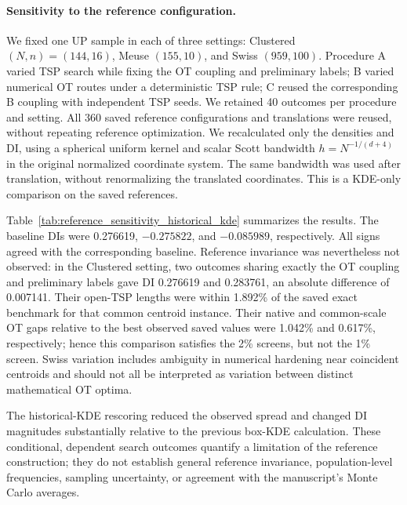 {\color{red}
\paragraph{Sensitivity to the reference configuration.}
We fixed one UP sample in each of three settings: Clustered $(N,n)=(144,16)$,
Meuse $(155,10)$, and Swiss $(959,100)$. Procedure A varied TSP search while
fixing the OT coupling and preliminary labels; B varied numerical OT routes
under a deterministic TSP rule; C reused the corresponding B coupling with
independent TSP seeds. We retained 40 outcomes per procedure and setting.
All 360 saved reference configurations and translations were reused, without
repeating reference optimization. We recalculated only the densities and DI,
using a spherical uniform kernel and scalar Scott bandwidth
$h=N^{-1/(d+4)}$ in the original normalized coordinate system. The same
bandwidth was used after translation, without renormalizing the translated
coordinates. This is a KDE-only comparison on the saved references.

Table~\ref{tab:reference_sensitivity_historical_kde} summarizes the results.
The baseline DIs were 0.276619, $-0.275822$, and $-0.085989$, respectively.
All signs agreed with the corresponding baseline. Reference invariance was
nevertheless not observed: in the Clustered setting, two outcomes sharing
exactly the OT coupling and preliminary labels gave DI 0.276619 and 0.283761,
an absolute difference of 0.007141. Their open-TSP lengths were within 1.892\%
of the saved exact benchmark for that common centroid instance. Their native
and common-scale OT gaps relative to the best observed saved values were
1.042\% and 0.617\%, respectively; hence this comparison satisfies the 2\%
screens, but not the 1\% screen. Swiss variation includes ambiguity in numerical
hardening near coincident centroids and should not all be interpreted as
variation between distinct mathematical OT optima.

The historical-KDE rescoring reduced the observed spread and changed DI
magnitudes substantially relative to the previous box-KDE calculation.
These conditional, dependent search outcomes quantify a limitation of the
reference construction; they do not establish general reference invariance,
population-level frequencies, sampling uncertainty, or agreement with the
manuscript's Monte Carlo averages.
}
